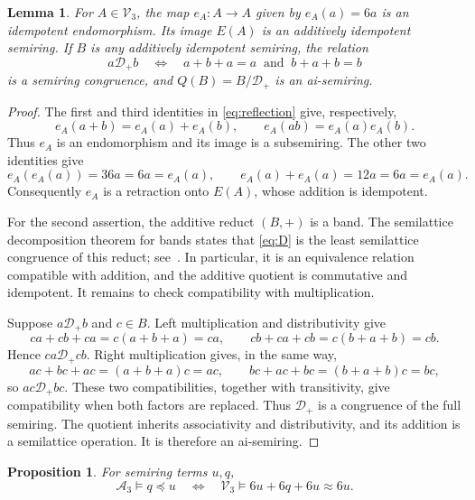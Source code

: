 \documentclass[11pt,reqno]{amsart}
\numberwithin{equation}{section}
\newtheorem{proposition}[theorem]{Proposition}
\newtheorem{lemma}[theorem]{Lemma}
\theoremstyle{definition}
\theoremstyle{remark}
\newcommand{\Vthree}{\mathcal V_3}
\newcommand{\Athree}{\mathcal A_3}
\newcommand{\eqid}{\approx}
\begin{document}
\begin{lemma}\label{lem:reflection}
For $A\in\Vthree$, the map $e_A:A\to A$ given by
$e_A(a)=6a$ is an idempotent endomorphism. Its image
$E(A)$ is an additively idempotent semiring.
If $B$ is any additively idempotent semiring, the relation
\begin{equation}\label{eq:D}
a\mathrel{\mathcal D_+}b
\quad\Longleftrightarrow\quad
a+b+a=a\ \text{ and }\ b+a+b=b
\end{equation}
is a semiring congruence, and $Q(B)=B/\mathcal D_+$ is
an ai-semiring.
\end{lemma}

\begin{proof}
The first and third identities in \eqref{eq:reflection}
give, respectively,
\[
e_A(a+b)=e_A(a)+e_A(b),\qquad
e_A(ab)=e_A(a)e_A(b).
\]
Thus $e_A$ is an endomorphism and its image is a
subsemiring. The other two identities give
\[
e_A(e_A(a))=36a=6a=e_A(a),\qquad
e_A(a)+e_A(a)=12a=6a=e_A(a).
\]
Consequently $e_A$ is a retraction onto $E(A)$,
whose addition is idempotent.

For the second assertion, the additive reduct $(B,+)$
is a band. The semilattice decomposition theorem for
bands states that \eqref{eq:D} is the least semilattice
congruence of this reduct; see~\cite{CP}. In particular,
it is an equivalence relation compatible with addition,
and the additive quotient is commutative and idempotent.
It remains to check compatibility with multiplication.

Suppose $a\mathrel{\mathcal D_+}b$ and $c\in B$.
Left multiplication and distributivity give
\[
ca+cb+ca=c(a+b+a)=ca,\qquad
cb+ca+cb=c(b+a+b)=cb.
\]
Hence $ca\mathrel{\mathcal D_+}cb$.
Right multiplication gives, in the same way,
\[
ac+bc+ac=(a+b+a)c=ac,\qquad
bc+ac+bc=(b+a+b)c=bc,
\]
so $ac\mathrel{\mathcal D_+}bc$.
These two compatibilities, together with transitivity,
give compatibility when both factors are replaced.
Thus $\mathcal D_+$ is a congruence of the full semiring.
The quotient inherits associativity and distributivity,
and its addition is a semilattice operation. It is
therefore an ai-semiring.
\end{proof}

\begin{proposition}\label{prop:translation}
For semiring terms $u,q$,
\[
\Athree\models q\preceq u
\quad\Longleftrightarrow\quad
\Vthree\models 6u+6q+6u\eqid6u.
\]
\end{proposition}
\end{document}
